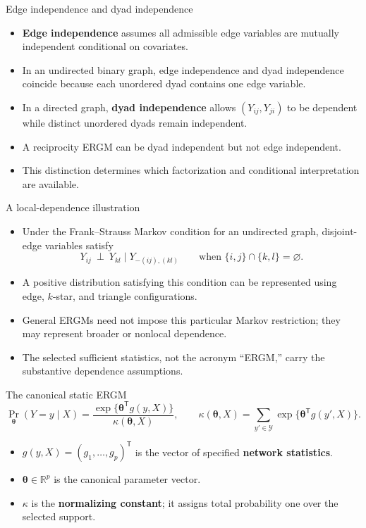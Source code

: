 \documentclass[aspectratio=169,11pt]{beamer}
\newcommand{\R}{\mathbb{R}}
\newcommand{\term}[1]{\textbf{\color{nupurple}#1}}
\begin{document}
\begin{frame}{Edge independence and dyad independence}
\begin{itemize}
\item \term{Edge independence} assumes all admissible edge variables are mutually independent conditional on covariates.
\item In an undirected binary graph, edge independence and dyad independence coincide because each unordered dyad contains one edge variable.
\item In a directed graph, \term{dyad independence} allows $(Y_{ij},Y_{ji})$ to be dependent while distinct unordered dyads remain independent.
\item A reciprocity ERGM can be dyad independent but not edge independent.
\item This distinction determines which factorization and conditional interpretation are available.
\end{itemize}
\end{frame}

\begin{frame}{A local-dependence illustration}
\begin{itemize}
\item Under the Frank--Strauss Markov condition for an undirected graph, disjoint-edge variables satisfy
\[
Y_{ij}\ \perp\ Y_{kl}\mid Y_{-(ij),(kl)}\qquad\text{when }\{i,j\}\cap\{k,l\}=\varnothing.
\]
\item A positive distribution satisfying this condition can be represented using edge, $k$-star, and triangle configurations.
\item General ERGMs need not impose this particular Markov restriction; they may represent broader or nonlocal dependence.
\item The selected sufficient statistics, not the acronym ``ERGM,'' carry the substantive dependence assumptions.
\end{itemize}
\end{frame}

\begin{frame}{The canonical static ERGM}
\[
\Pr_{\boldsymbol\theta}(Y=y\mid X)
=\frac{\exp\{\boldsymbol\theta^{\mathsf T}g(y,X)\}}
{\kappa(\boldsymbol\theta,X)},
\qquad
\kappa(\boldsymbol\theta,X)=\sum_{y'\in\mathcal{Y}}
\exp\{\boldsymbol\theta^{\mathsf T}g(y',X)\}.
\]
\begin{itemize}
\item $g(y,X)=(g_1,\ldots,g_p)^{\mathsf T}$ is the vector of specified \term{network statistics}.
\item $\boldsymbol\theta\in\R^p$ is the canonical parameter vector.
\item $\kappa$ is the \term{normalizing constant}; it assigns total probability one over the selected support.
\end{itemize}
\end{frame}
\end{document}
